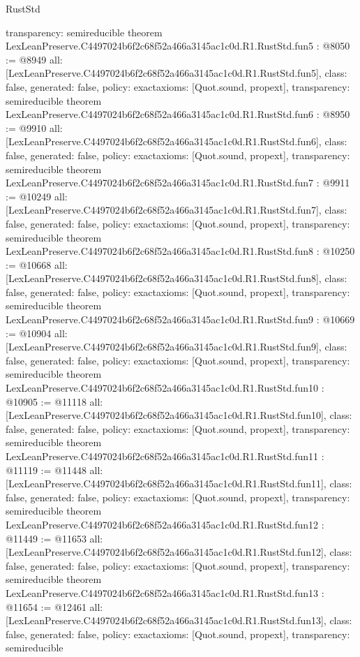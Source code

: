 \begin{lexlean}{RustStd}
\begin{coremodule}
{  transparency: semireducible
}
theorem LexLeanPreserve.C4497024b6f2c68f52a466a3145ac1c0d.R1.RustStd.fun5 : @8050 := @8949 {
  all: [LexLeanPreserve.C4497024b6f2c68f52a466a3145ac1c0d.R1.RustStd.fun5],
  class: false,
  generated: false,
  policy: exact{axioms: [Quot.sound, propext]},
  transparency: semireducible
}
theorem LexLeanPreserve.C4497024b6f2c68f52a466a3145ac1c0d.R1.RustStd.fun6 : @8950 := @9910 {
  all: [LexLeanPreserve.C4497024b6f2c68f52a466a3145ac1c0d.R1.RustStd.fun6],
  class: false,
  generated: false,
  policy: exact{axioms: [Quot.sound, propext]},
  transparency: semireducible
}
theorem LexLeanPreserve.C4497024b6f2c68f52a466a3145ac1c0d.R1.RustStd.fun7 : @9911 := @10249 {
  all: [LexLeanPreserve.C4497024b6f2c68f52a466a3145ac1c0d.R1.RustStd.fun7],
  class: false,
  generated: false,
  policy: exact{axioms: [Quot.sound, propext]},
  transparency: semireducible
}
theorem LexLeanPreserve.C4497024b6f2c68f52a466a3145ac1c0d.R1.RustStd.fun8 : @10250 := @10668 {
  all: [LexLeanPreserve.C4497024b6f2c68f52a466a3145ac1c0d.R1.RustStd.fun8],
  class: false,
  generated: false,
  policy: exact{axioms: [Quot.sound, propext]},
  transparency: semireducible
}
theorem LexLeanPreserve.C4497024b6f2c68f52a466a3145ac1c0d.R1.RustStd.fun9 : @10669 := @10904 {
  all: [LexLeanPreserve.C4497024b6f2c68f52a466a3145ac1c0d.R1.RustStd.fun9],
  class: false,
  generated: false,
  policy: exact{axioms: [Quot.sound, propext]},
  transparency: semireducible
}
theorem LexLeanPreserve.C4497024b6f2c68f52a466a3145ac1c0d.R1.RustStd.fun10 : @10905 := @11118 {
  all: [LexLeanPreserve.C4497024b6f2c68f52a466a3145ac1c0d.R1.RustStd.fun10],
  class: false,
  generated: false,
  policy: exact{axioms: [Quot.sound, propext]},
  transparency: semireducible
}
theorem LexLeanPreserve.C4497024b6f2c68f52a466a3145ac1c0d.R1.RustStd.fun11 : @11119 := @11448 {
  all: [LexLeanPreserve.C4497024b6f2c68f52a466a3145ac1c0d.R1.RustStd.fun11],
  class: false,
  generated: false,
  policy: exact{axioms: [Quot.sound, propext]},
  transparency: semireducible
}
theorem LexLeanPreserve.C4497024b6f2c68f52a466a3145ac1c0d.R1.RustStd.fun12 : @11449 := @11653 {
  all: [LexLeanPreserve.C4497024b6f2c68f52a466a3145ac1c0d.R1.RustStd.fun12],
  class: false,
  generated: false,
  policy: exact{axioms: [Quot.sound, propext]},
  transparency: semireducible
}
theorem LexLeanPreserve.C4497024b6f2c68f52a466a3145ac1c0d.R1.RustStd.fun13 : @11654 := @12461 {
  all: [LexLeanPreserve.C4497024b6f2c68f52a466a3145ac1c0d.R1.RustStd.fun13],
  class: false,
  generated: false,
  policy: exact{axioms: [Quot.sound, propext]},
  transparency: semireducible
}
\end{coremodule}
\end{lexlean}

